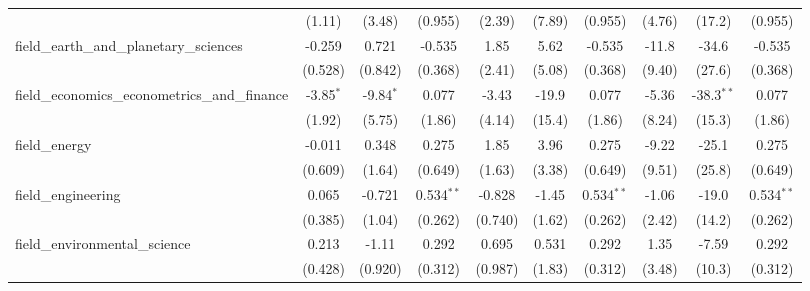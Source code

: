 \begin{tabular}{lccccccccc}
                                                               & (1.11)        & (3.48)        & (0.955)        & (2.39)        & (7.89)       & (0.955)        & (4.76)       & (17.2)       & (0.955)\\   
   field\_earth\_and\_planetary\_sciences                      & -0.259        & 0.721         & -0.535         & 1.85          & 5.62         & -0.535         & -11.8        & -34.6        & -0.535\\   
                                                               & (0.528)       & (0.842)       & (0.368)        & (2.41)        & (5.08)       & (0.368)        & (9.40)       & (27.6)       & (0.368)\\   
   field\_economics\_econometrics\_and\_finance                & -3.85$^{*}$   & -9.84$^{*}$   & 0.077          & -3.43         & -19.9        & 0.077          & -5.36        & -38.3$^{**}$ & 0.077\\   
                                                               & (1.92)        & (5.75)        & (1.86)         & (4.14)        & (15.4)       & (1.86)         & (8.24)       & (15.3)       & (1.86)\\   
   field\_energy                                               & -0.011        & 0.348         & 0.275          & 1.85          & 3.96         & 0.275          & -9.22        & -25.1        & 0.275\\   
                                                               & (0.609)       & (1.64)        & (0.649)        & (1.63)        & (3.38)       & (0.649)        & (9.51)       & (25.8)       & (0.649)\\   
   field\_engineering                                          & 0.065         & -0.721        & 0.534$^{**}$   & -0.828        & -1.45        & 0.534$^{**}$   & -1.06        & -19.0        & 0.534$^{**}$\\   
                                                               & (0.385)       & (1.04)        & (0.262)        & (0.740)       & (1.62)       & (0.262)        & (2.42)       & (14.2)       & (0.262)\\   
   field\_environmental\_science                               & 0.213         & -1.11         & 0.292          & 0.695         & 0.531        & 0.292          & 1.35         & -7.59        & 0.292\\   
                                                               & (0.428)       & (0.920)       & (0.312)        & (0.987)       & (1.83)       & (0.312)        & (3.48)       & (10.3)       & (0.312)\\   

\end{tabular}
